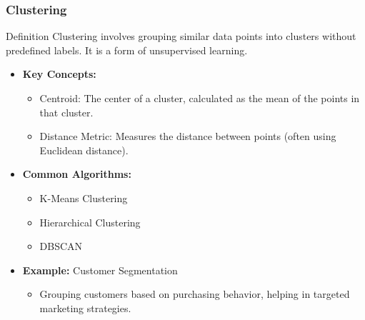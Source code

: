 \documentclass[aspectratio=169]{beamer}
\begin{document}
\begin{frame}[fragile]
    \frametitle{Clustering}
    \begin{block}{Definition}
        Clustering involves grouping similar data points into clusters without predefined labels. It is a form of unsupervised learning.
    \end{block}

    \begin{itemize}
        \item \textbf{Key Concepts:}
            \begin{itemize}
                \item Centroid: The center of a cluster, calculated as the mean of the points in that cluster.
                \item Distance Metric: Measures the distance between points (often using Euclidean distance).
            \end{itemize}
        \item \textbf{Common Algorithms:}
            \begin{itemize}
                \item K-Means Clustering
                \item Hierarchical Clustering
                \item DBSCAN
            \end{itemize}
        \item \textbf{Example:} Customer Segmentation
            \begin{itemize}
                \item Grouping customers based on purchasing behavior, helping in targeted marketing strategies.
            \end{itemize}
    \end{itemize}
\end{frame}
\end{document}
